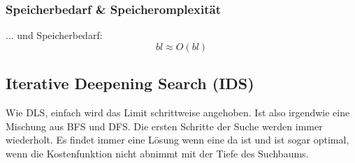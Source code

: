 \subsubsection{Speicherbedarf \& Speicheromplexität}
... und Speicherbedarf:
\begin{displaymath}
bl \approx O(bl)
\end{displaymath}

\subsection{Iterative Deepening Search (IDS)}
Wie DLS, einfach wird das Limit schrittweise angehoben. Ist also irgendwie eine Mischung aus BFS und DFS. Die ersten Schritte der Suche werden immer wiederholt. Es findet immer eine Lösung wenn eine da ist und ist sogar optimal, wenn die Kostenfunktion nicht abnimmt mit der Tiefe des Suchbaums.